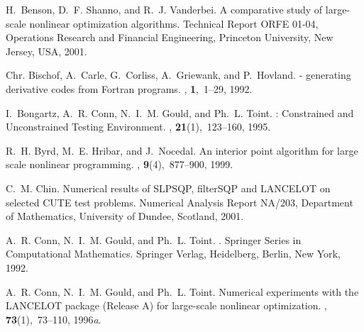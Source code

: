 \documentclass[acmtocl,acmnow]{acmtrans2m}
\begin{document}
%
%
\begin{thebibliography}{xx}

H.~Benson, D.~F. Shanno, and R.~J. Vanderbei.
\newblock A comparative study of large-scale nonlinear optimization algorithms.
\newblock Technical Report ORFE 01-04, Operations Research and Financial
  Engineering, Princeton University, New Jersey, USA, 2001.

Chr. Bischof, A.~Carle, G.~Corliss, A.~Griewank, and P.~Hovland.
 - generating derivative codes from {F}ortran programs.
, {\bf 1},~1--29, 1992.

I.~Bongartz, A.~R. Conn, N.~I.~M. Gould, and Ph.~L. Toint.
: {C}onstrained and {U}nconstrained {T}esting
  {E}nvironment.
, {\bf
  21}(1),~123--160, 1995.

R.~H. Byrd, M.~E. Hribar, and J.~Nocedal.
\newblock An interior point algorithm for large scale nonlinear programming.
, {\bf 9}(4),~877--900, 1999.

C.~M. Chin.
\newblock Numerical results of {SLPSQP}, filter{SQP} and {LANCELOT} on selected
  {CUTE} test problems.
\newblock Numerical Analysis Report NA/203, Department of Mathematics,
  University of Dundee, Scotland, 2001.

A.~R. Conn, N.~I.~M. Gould, and Ph.~L. Toint.
.
\newblock Springer Series in Computational Mathematics. Springer Verlag,
  Heidelberg, Berlin, New York, 1992.

A.~R. Conn, N.~I.~M. Gould, and Ph.~L. Toint.
\newblock Numerical experiments with the {{\sf LANCELOT}} package ({R}elease
  {A}) for large-scale nonlinear optimization.
, {\bf 73}(1),~73--110,
  1996{\em a}.


\end{thebibliography}
\end{document}
